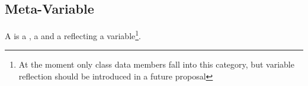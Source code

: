 \subsection{Meta-Variable}
\label{concept-Meta-Variable}

A  is a , a  and a 
reflecting a variable\footnote{At the moment only class data members fall
into this category, but variable reflection should be introduced in a future
proposal}.




